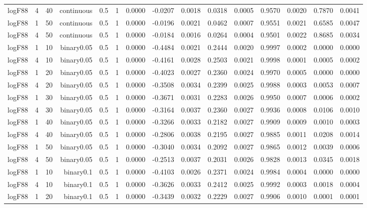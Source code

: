\begin{longtable}{rrrrrrrrrrrrrrr}
  logF88 & 4 & 40 & continuous & 0.5 & 1 & 0.0000 & -0.0207 & 0.0018 & 0.0318 & 0.0005 & 0.9570 & 0.0020 & 0.7870 & 0.0041 \\ 
  logF88 & 1 & 50 & continuous & 0.5 & 1 & 0.0000 & -0.0196 & 0.0021 & 0.0462 & 0.0007 & 0.9551 & 0.0021 & 0.6585 & 0.0047 \\ 
  logF88 & 4 & 50 & continuous & 0.5 & 1 & 0.0000 & -0.0184 & 0.0016 & 0.0264 & 0.0004 & 0.9501 & 0.0022 & 0.8685 & 0.0034 \\ 
  logF88 & 1 & 10 & binary0.05 & 0.5 & 1 & 0.0000 & -0.4484 & 0.0021 & 0.2444 & 0.0020 & 0.9997 & 0.0002 & 0.0000 & 0.0000 \\ 
  logF88 & 4 & 10 & binary0.05 & 0.5 & 1 & 0.0000 & -0.4161 & 0.0028 & 0.2503 & 0.0021 & 0.9998 & 0.0001 & 0.0005 & 0.0002 \\ 
  logF88 & 1 & 20 & binary0.05 & 0.5 & 1 & 0.0000 & -0.4023 & 0.0027 & 0.2360 & 0.0024 & 0.9970 & 0.0005 & 0.0000 & 0.0000 \\ 
  logF88 & 4 & 20 & binary0.05 & 0.5 & 1 & 0.0000 & -0.3508 & 0.0034 & 0.2399 & 0.0025 & 0.9988 & 0.0003 & 0.0053 & 0.0007 \\ 
  logF88 & 1 & 30 & binary0.05 & 0.5 & 1 & 0.0000 & -0.3671 & 0.0031 & 0.2283 & 0.0026 & 0.9950 & 0.0007 & 0.0006 & 0.0002 \\ 
  logF88 & 4 & 30 & binary0.05 & 0.5 & 1 & 0.0000 & -0.3164 & 0.0037 & 0.2360 & 0.0027 & 0.9936 & 0.0008 & 0.0106 & 0.0010 \\ 
  logF88 & 1 & 40 & binary0.05 & 0.5 & 1 & 0.0000 & -0.3266 & 0.0033 & 0.2182 & 0.0027 & 0.9909 & 0.0009 & 0.0010 & 0.0003 \\ 
  logF88 & 4 & 40 & binary0.05 & 0.5 & 1 & 0.0000 & -0.2806 & 0.0038 & 0.2195 & 0.0027 & 0.9885 & 0.0011 & 0.0208 & 0.0014 \\ 
  logF88 & 1 & 50 & binary0.05 & 0.5 & 1 & 0.0000 & -0.3040 & 0.0034 & 0.2092 & 0.0027 & 0.9865 & 0.0012 & 0.0039 & 0.0006 \\ 
  logF88 & 4 & 50 & binary0.05 & 0.5 & 1 & 0.0000 & -0.2513 & 0.0037 & 0.2031 & 0.0026 & 0.9828 & 0.0013 & 0.0345 & 0.0018 \\ 
  logF88 & 1 & 10 & binary0.1 & 0.5 & 1 & 0.0000 & -0.4103 & 0.0026 & 0.2371 & 0.0024 & 0.9984 & 0.0004 & 0.0000 & 0.0000 \\ 
  logF88 & 4 & 10 & binary0.1 & 0.5 & 1 & 0.0000 & -0.3626 & 0.0033 & 0.2412 & 0.0025 & 0.9992 & 0.0003 & 0.0018 & 0.0004 \\ 
  logF88 & 1 & 20 & binary0.1 & 0.5 & 1 & 0.0000 & -0.3439 & 0.0032 & 0.2229 & 0.0027 & 0.9906 & 0.0010 & 0.0001 & 0.0001 \\ 

\end{longtable}
